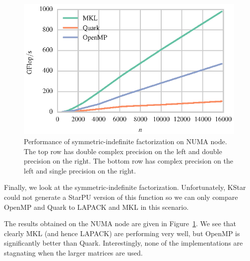 \documentclass[a4paper,12pt]{article}
\begin{document}
\begin{figure}[t]
  \includegraphics[scale=.85]{fig/kebnekaise_ssytrf_weak_scaling.eps}
  \caption{Performance of symmetric-indefinite factorization on NUMA node.
    The top row has double complex precision on the left and double
    precision on the right.
    The bottom row has complex precision on the left and single
    precision on the right.}
  \label{fig.ldlt_numa}
\end{figure}

Finally,
we look at the symmetric-indefinite factorization.
Unfortunately, KStar could not generate a StarPU version of this
function so we can only compare OpenMP and Quark
to LAPACK and MKL in this scenario.

The results obtained on the NUMA node are given in
Figure~\ref{fig.ldlt_numa}.
We see that clearly MKL (and hence LAPACK) are performing very well,
but OpenMP is significantly better than Quark.
Interestingly,
none of the implementations are stagnating when the larger matrices
are used.
\end{document}
